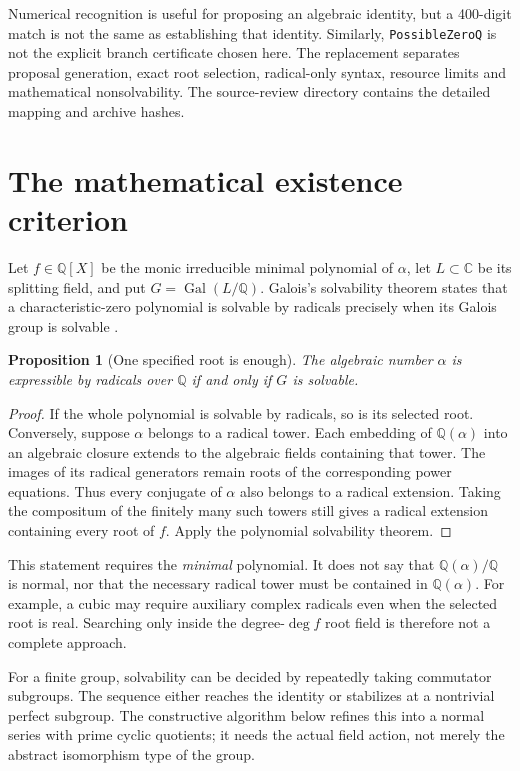 \documentclass[11pt,letterpaper]{article}
\newcommand{\Q}{\mathbb Q}\newcommand{\C}{\mathbb C}
\newcommand{\Gal}{\operatorname{Gal}}\newcommand{\rad}{\operatorname{rad}}
\newcommand{\code}[1]{\texttt{#1}}
\newtheorem{proposition}[theorem]{Proposition}
\theoremstyle{definition}\newtheorem{definition}[theorem]{Definition}
\theoremstyle{remark}\newtheorem{remark}[theorem]{Remark}
\begin{document}
Numerical recognition is useful for proposing an algebraic identity, but a
400-digit match is not the same as establishing that identity. Similarly,
\code{PossibleZeroQ} is not the explicit branch certificate chosen here.
The replacement separates proposal generation, exact root selection,
radical-only syntax, resource limits and mathematical nonsolvability.
The source-review directory contains the detailed mapping and archive hashes.

\section{The mathematical existence criterion}

Let \(f\in\Q[X]\) be the monic irreducible minimal polynomial of \(\alpha\),
let \(L\subset\C\) be its splitting field, and put \(G=\Gal(L/\Q)\).
Galois's solvability theorem states that a characteristic-zero polynomial
is solvable by radicals precisely when its Galois group is solvable
\cite[Theorem 5.34]{milne}.

\begin{proposition}[One specified root is enough]
The algebraic number \(\alpha\) is expressible by radicals over \(\Q\) if and
only if \(G\) is solvable.
\end{proposition}
\begin{proof}
If the whole polynomial is solvable by radicals, so is its selected root.
Conversely, suppose \(\alpha\) belongs to a radical tower. Each embedding of
\(\Q(\alpha)\) into an algebraic closure extends to the algebraic fields
containing that tower. The images of its radical generators remain roots of
the corresponding power equations. Thus every conjugate of \(\alpha\) also
belongs to a radical extension. Taking the compositum of the finitely many
such towers still gives a radical extension containing every root of \(f\).
Apply the polynomial solvability theorem.
\end{proof}

This statement requires the \emph{minimal} polynomial. It does not say that
\(\Q(\alpha)/\Q\) is normal, nor that the necessary radical tower must be
contained in \(\Q(\alpha)\). For example, a cubic may require auxiliary
complex radicals even when the selected root is real. Searching only inside
the degree-\(\deg f\) root field is therefore not a complete approach.

For a finite group, solvability can be decided by repeatedly taking
commutator subgroups. The sequence either reaches the identity or stabilizes
at a nontrivial perfect subgroup. The constructive algorithm below refines
this into a normal series with prime cyclic quotients; it needs the actual
field action, not merely the abstract isomorphism type of the group.
\end{document}
